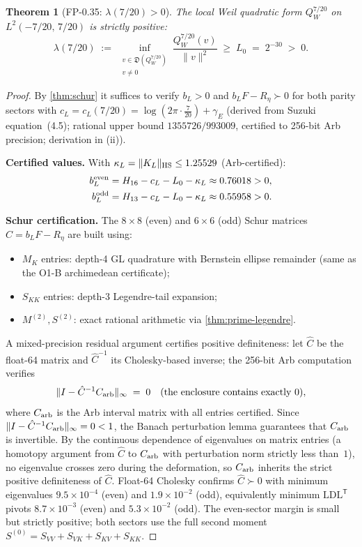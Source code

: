 \documentclass[12pt,a4paper]{amsart}
\theoremstyle{plain}
\newtheorem{theorem}{Theorem}[section]
\theoremstyle{definition}
\newcommand{\Lzero}{L_0}             %
\begin{document}
\begin{theorem}[FP-0.35: $\lambda(7/20) > 0$]
\label{thm:fp035-proved}
The local Weil quadratic form $Q_W^{7/20}$ on $L^2(-7/20,\,7/20)$ is
strictly positive:
\[
  \lambda(7/20)
  \;:=\; \inf_{\substack{v \in \mathfrak{D}(Q_W^{7/20})\\ v \ne 0}}
          \frac{Q_W^{7/20}(v)}{\|v\|^2}
  \;\ge\; \Lzero \;=\; 2^{-30} \;>\; 0.
\]
\end{theorem}

\begin{proof}
By \cref{thm:schur} it suffices to verify $b_L > 0$ and
$b_L F - R_\eta \succ 0$ for both parity sectors with
$c_L = c_L(7/20) = \log(2\pi\cdot\tfrac{7}{20}) + \gamma_E$
(derived from Suzuki~\cite{Suzuki2026} equation~(4.5); rational upper bound
$1355726/993009$, certified to 256-bit Arb precision;
derivation in (ii)).

\textbf{Certified values.}
With $\kappa_L = \|K_L\|_{\rm HS} \le 1.25529$ (Arb-certified):
\begin{align*}
  b_L^{\rm even} &= H_{16} - c_L - \Lzero - \kappa_L \approx 0.76018 > 0, \\
  b_L^{\rm odd}  &= H_{13} - c_L - \Lzero - \kappa_L \approx 0.55958 > 0.
\end{align*}

\textbf{Schur certification.}
The $8 \times 8$ (even) and $6 \times 6$ (odd) Schur matrices
$C = b_L F - R_\eta$ are built using:
\begin{itemize}[leftmargin=1.5em,itemsep=1pt]
  \item $M_K$ entries: depth-4 GL quadrature with Bernstein ellipse remainder
    (same as the O1-B archimedean certificate);
  \item $S_{KK}$ entries: depth-3 Legendre-tail expansion;
  \item $M^{(2)}, S^{(2)}$: exact rational arithmetic via \cref{thm:prime-legendre}.
\end{itemize}
A mixed-precision residual argument certifies positive definiteness:
let $\hat C$ be the float-64 matrix and $\hat C^{-1}$ its Cholesky-based
inverse; the 256-bit Arb computation verifies
\[
  \|I - \hat C^{-1} C_{\rm arb}\|_\infty \;=\; 0
  \quad\text{(the enclosure contains exactly $0$)},
\]
where $C_{\rm arb}$ is the Arb interval matrix with all entries certified.
Since $\|I - \hat C^{-1} C_{\rm arb}\|_\infty = 0 < 1$, the Banach
perturbation lemma guarantees that $C_{\rm arb}$ is invertible.
By the continuous dependence of eigenvalues on matrix entries
(a homotopy argument from $\hat C$ to $C_{\rm arb}$ with perturbation
norm strictly less than~$1$), no eigenvalue crosses zero during the
deformation, so $C_{\rm arb}$ inherits the strict positive definiteness
of $\hat C$.  Float-64 Cholesky confirms $\hat C \succ 0$
with minimum eigenvalues $9.5\times10^{-4}$ (even) and $1.9\times10^{-2}$ (odd),
equivalently minimum $\mathrm{LDL}^{\mathsf T}$ pivots $8.7\times10^{-3}$ (even)
and $5.3\times10^{-2}$ (odd).  The even-sector margin is small but strictly
positive; both sectors use the full second moment
$S^{(0)} = S_{VV} + S_{VK} + S_{KV} + S_{KK}$.


\end{proof}
\end{document}
